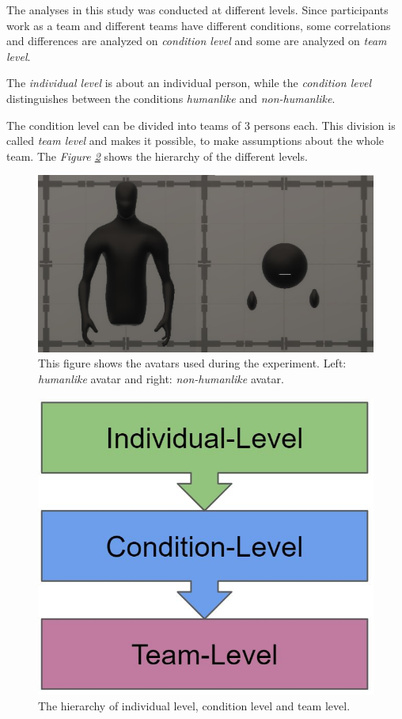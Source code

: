 \documentclass[sigchi]{acmart}
\begin{document}
The analyses in this study was conducted at different levels.
Since participants work as a team and different teams have different conditions, some correlations and differences are analyzed on \textit{condition level} and some are analyzed on \textit{team level}.

The \textit{individual level} is about an individual person, while the \textit{condition level} distinguishes between the conditions \textit{humanlike} and \textit{non-humanlike}.

The condition level can be divided into teams of 3 persons each. This division is called \textit{team level} and makes it possible, to make assumptions about the whole team. 
The \textit{Figure \ref{DifferentLevels}} shows the hierarchy of the different levels.

\begin{figure}[h]
  \centering
 		\includegraphics[width=0.60\linewidth]{Abbildungen/Avatars.JPG}
			\caption[The avatars]{This figure shows the avatars used during the experiment. Left: \textit{humanlike} avatar and right: \textit{non-humanlike} avatar.}
			\label{Avatars}
\end{figure}	

\begin{figure}[h]
  \centering
 		\includegraphics[width=0.5\linewidth]{Abbildungen/DifferentLevels.JPG}	
			\caption[The hierarchy levels]{The hierarchy of individual level, condition level and team level.}
			\label{DifferentLevels}
\end{figure}	
	
\end{document}
